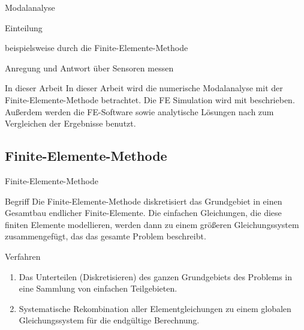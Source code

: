 \begin{frame}{Modalanalyse}
	\begin{block}{Einteilung}
		\begin{description}[]
			\item[Numerisch:] beispielsweise durch die Finite-Elemente-Methode
			\item[Experimentell:] Anregung und Antwort über Sensoren messen
		\end{description}
	\end{block}
	
	\pause

	\begin{exampleblock}{In dieser Arbeit}
		In dieser Arbeit wird die numerische Modalanalyse mit der Finite-Elemente-Methode betrachtet. Die FE Simulation wird mit \Matlab beschrieben. Außerdem werden die FE-Software \Ansys sowie analytische Lösungen nach \cite{stephan1995schwingungen} zum Vergleichen der Ergebnisse benutzt.
	\end{exampleblock}
	
\end{frame}


\subsection{Finite-Elemente-Methode}


\begin{frame}{Finite-Elemente-Methode}
	\begin{alertblock}{Begriff}
		Die Finite-Elemente-Methode diskretisiert das Grundgebiet in einen Gesamtbau endlicher Finite-Elemente. Die einfachen Gleichungen, die diese finiten Elemente modellieren, werden dann zu einem größeren Gleichungssystem	zusammengefügt, das das gesamte Problem beschreibt.
	\end{alertblock}

	\begin{exampleblock}{Verfahren}
		\begin{enumerate}
			\item Das Unterteilen (Diskretisieren) des ganzen Grundgebiets des Problems in eine Sammlung von einfachen Teilgebieten.
			\item Systematische Rekombination aller Elementgleichungen zu einem globalen Gleichungssystem für die endgültige Berechnung.
		\end{enumerate}
	\end{exampleblock}
\end{frame}

